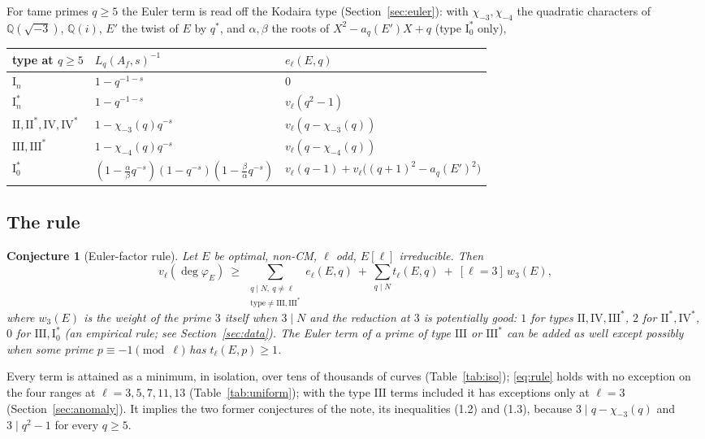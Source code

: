 \documentclass[11pt]{amsart}
\newtheorem{conjecture}[theorem]{Conjecture}
\theoremstyle{definition}
\newcommand{\Q}{\mathbb{Q}}\newcommand{\Z}{\mathbb{Z}}\newcommand{\F}{\mathbb{F}}
\newcommand{\degphi}{\deg\varphi_E}\newcommand{\Gal}{\operatorname{Gal}}\newcommand{\ad}{\operatorname{ad}^0}
\begin{document}
For tame primes $q\ge5$ the Euler term is read off the Kodaira type (Section~\ref{sec:euler}): with $\chi_{-3},\chi_{-4}$ the quadratic characters of $\Q(\sqrt{-3})$, $\Q(i)$, $E'$ the twist of $E$ by $q^*$, and $\alpha,\beta$ the roots of $X^2-a_q(E')X+q$ (type $\mathrm{I}_0^*$ only),
\begin{center}\footnotesize
\begin{tabular}{lll}
\toprule
type at $q\ge5$ & $L_q(A_f,s)^{-1}$ & $e_\ell(E,q)$\\
\midrule
$\mathrm{I}_n$ & $1-q^{-1-s}$ & $0$\\
$\mathrm{I}_n^*$ & $1-q^{-1-s}$ & $v_\ell(q^2-1)$\\
$\mathrm{II},\mathrm{II}^*,\mathrm{IV},\mathrm{IV}^*$ & $1-\chi_{-3}(q)q^{-s}$ & $v_\ell(q-\chi_{-3}(q))$\\
$\mathrm{III},\mathrm{III}^*$ & $1-\chi_{-4}(q)q^{-s}$ & $v_\ell(q-\chi_{-4}(q))$\\
$\mathrm{I}_0^*$ & $(1-\tfrac{\alpha}{\beta}q^{-s})(1-q^{-s})(1-\tfrac{\beta}{\alpha}q^{-s})$ & $v_\ell(q-1)+v_\ell\bigl((q+1)^2-a_q(E')^2\bigr)$\\
\bottomrule
\end{tabular}
\end{center}

\subsection{The rule}
\begin{conjecture}[Euler-factor rule]\label{conj:euler}
Let $E$ be optimal, non-CM, $\ell$ odd, $E[\ell]$ irreducible. Then
\begin{equation}\label{eq:rule}
v_\ell(\degphi)\ \ge\ \sum_{\substack{q\mid N,\ q\ne\ell\\ \text{type}\ne\mathrm{III},\mathrm{III}^*}}e_\ell(E,q)\ +\ \sum_{q\mid N}t_\ell(E,q)\ +\ [\ell=3]\,w_3(E),
\end{equation}
where $w_3(E)$ is the weight of the prime $3$ itself when $3\mid N$ and the reduction at $3$ is potentially good: $1$ for types $\mathrm{II},\mathrm{IV},\mathrm{III}^*$, $2$ for $\mathrm{II}^*,\mathrm{IV}^*$, $0$ for $\mathrm{III},\mathrm{I}_0^*$ (an empirical rule; see Section~\ref{sec:data}). The Euler term of a prime of type $\mathrm{III}$ or $\mathrm{III}^*$ can be added as well except possibly when some prime $p\equiv-1\pmod\ell$ has $t_\ell(E,p)\ge1$.
\end{conjecture}

Every term is attained as a minimum, in isolation, over tens of thousands of curves (Table~\ref{tab:iso}); \eqref{eq:rule} holds with no exception on the four ranges at $\ell=3,5,7,11,13$ (Table~\ref{tab:uniform}); with the type $\mathrm{III}$ terms included it has exceptions only at $\ell=3$ (Section~\ref{sec:anomaly}). It implies the two former conjectures of the note, its inequalities (1.2) and (1.3), because $3\mid q-\chi_{-3}(q)$ and $3\mid q^2-1$ for every $q\ge5$.
\end{document}
